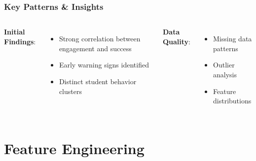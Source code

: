 \documentclass{beamer}
\begin{document}
\begin{frame}
\frametitle{Key Patterns & Insights}
    \begin{columns}
        \textbf{Initial Findings}:
            \begin{itemize}
            \item Strong correlation between engagement and success
            \item Early warning signs identified
            \item Distinct student behavior clusters
            \end{itemize}
            
        \textbf{Data Quality}:
            \begin{itemize}
            \item Missing data patterns
            \item Outlier analysis
            \item Feature distributions
            \end{itemize}
                
    \end{columns}
\end{frame}

\section{Feature Engineering}
\end{document}
